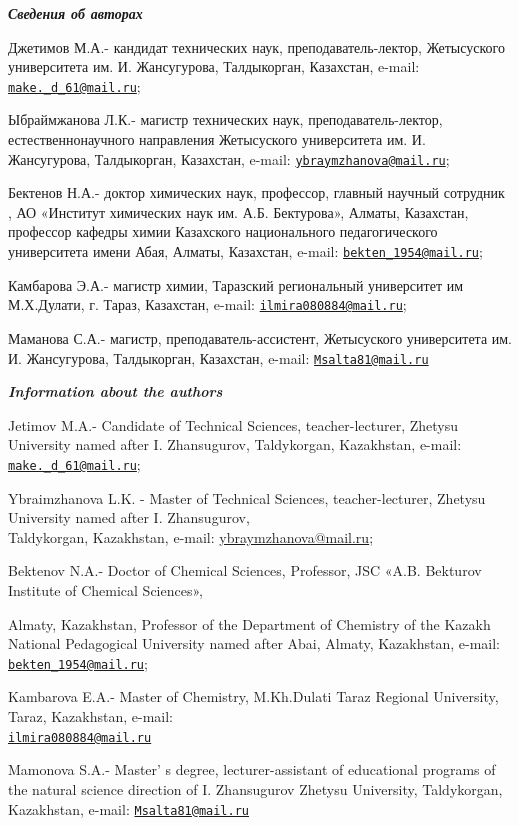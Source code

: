 \begin{authorinfo}
\hspace{1em}\emph{{\bfseries Сведения об авторах}}

Джетимов М.А.- кандидат технических наук, преподаватель-лектор,
Жетысуского университета им. И. Жансугурова, Талдыкорган, Казахстан,
e-mail:
\href{mailto:make._d_61@mail.ru}{\nolinkurl{make.\_d\_61@mail.ru}};

Ыбраймжанова Л.К.- магистр технических наук, преподаватель-лектор,
естественнонаучного направления Жетысуского университета им. И.
Жансугурова, Талдыкорган, Казахстан, e-mail:
\href{mailto:ybraymzhanova@mail.ru}{\nolinkurl{ybraymzhanova@mail.ru}};

Бектенов Н.А.- доктор химических наук, профессор, главный научный
сотрудник , АО «Институт химических наук им. А.Б. Бектурова», Алматы,
Казахстан, профессор кафедры химии Казахского национального
педагогического университета имени Абая, Алматы, Казахстан, e-mail:
\href{mailto:bekten_1954@mail.ru}{\nolinkurl{bekten\_1954@mail.ru}};

Камбарова Э.А.- магистр химии, Таразский региональный университет им
М.Х.Дулати, г. Тараз, Казахстан, e-mail:
\href{mailto:ilmira080884@mail.ru}{\nolinkurl{ilmira080884@mail.ru}};

Маманова С.А.- магистр, преподаватель-ассистент, Жетысуского
университета им. И. Жансугурова, Талдыкорган, Казахстан, e-mail:
\href{mailto:Msalta81@mail.ru}{\nolinkurl{Msalta81@mail.ru}}

\hspace{1em}\emph{{\bfseries Information about the authors}}

Jetimov M.A.- Candidate of Technical Sciences, teacher-lecturer, Zhetysu
University named after I. Zhansugurov, Taldykorgan, Kazakhstan, e-mail:
\href{mailto:make._d_61@mail.ru}{\nolinkurl{make.\_d\_61@mail.ru}};

Ybraimzhanova L.K. - Master of Technical Sciences, teacher-lecturer,
Zhetysu University named after I. Zhansugurov, \\ Taldykorgan, Kazakhstan,
e-mail: \href{mailto:ybraymzhanova@mail.ruu}{ybraymzhanova@mail.ru};

Bektenov N.A.- Doctor of Chemical Sciences, Professor, JSC «A.B.
Bekturov Institute of Chemical Sciences»,

Almaty, Kazakhstan, Professor of the Department of Chemistry of the
Kazakh National Pedagogical University named after Abai, Almaty,
Kazakhstan, e-mail:
\href{mailto:bekten_1954@mail.ru}{\nolinkurl{bekten\_1954@mail.ru}};

Kambarova E.A.- Master of Chemistry, M.Kh.Dulati Taraz Regional
University, Taraz, Kazakhstan, e-mail:
\\\href{mailto:ilmira080884@mail.ru}{\nolinkurl{ilmira080884@mail.ru}}

Mamonova S.A.- Master' s degree, lecturer-assistant of
educational programs of the natural science direction of I. Zhansugurov
Zhetysu University, Taldykorgan, Kazakhstan, e-mail:
\href{mailto:Msalta81@mail.ru}{\nolinkurl{Msalta81@mail.ru}}
\end{authorinfo}
